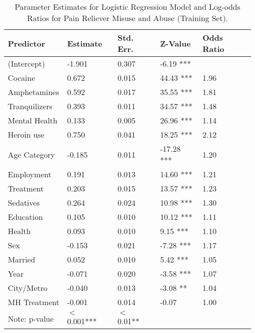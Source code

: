 \documentclass[sigconf]{acmart}
\begin{document}
\begin{table}
  \caption{Parameter Estimates for Logistic Regression Model and Log-odds 
  Ratios for Pain Reliever Misuse and Abuse (Training Set).}
  \label{tab:freq}
  \begin{tabular}{lllll}
    \toprule
    Predictor&  Estimate& Std. Err.& Z-Value & Odds Ratio \\    
    \midrule
    (Intercept)   & -1.901 &  0.307 &  -6.19 *** &   \\
    Cocaine       &  0.672 &  0.015 &  44.43 *** & 1.96  \\
    Amphetamines  &  0.592 &  0.017 &  35.55 *** & 1.81  \\
    Tranquilizers &  0.393 &  0.011 &  34.57 *** & 1.48  \\
    Mental Health &  0.133 &  0.005 &  26.96 *** & 1.14  \\
    Heroin use    &  0.750 &  0.041 &  18.25 *** & 2.12  \\
    Age Category  & -0.185 &  0.011 & -17.28 *** & 1.20  \\
    Employment    &  0.191 &  0.013 &  14.60 *** & 1.21  \\
    Treatment     &  0.203 &  0.015 &  13.57 *** & 1.23  \\
    Sedatives     &  0.264 &  0.024 &  10.98 *** & 1.30  \\
    Education     &  0.105 &  0.010 &  10.12 *** & 1.11  \\
    Health        &  0.093 &  0.010 &   9.15 *** & 1.10  \\
    Sex           & -0.153 &  0.021 &  -7.28 *** & 1.17  \\
    Married       &  0.052 &  0.010 &   5.42 *** & 1.05  \\
    Year          & -0.071 &  0.020 &  -3.58 *** & 1.07  \\
    City/Metro    & -0.040 &  0.013 &  -3.08 **  & 1.04  \\
    MH Treatment  & -0.001 &  0.014 &  -0.07     & 1.00  \\
    \bottomrule 
    Note: p-value& $<$ 0.001***  & $<$ 0.01** &  &   
  \end{tabular}
\end{table}

\end{document}
